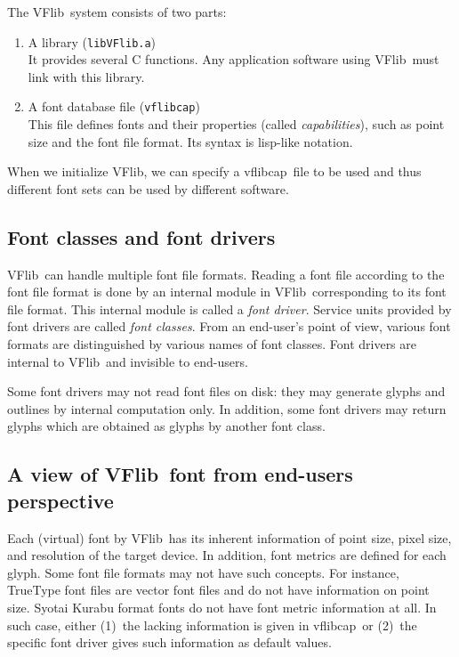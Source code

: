 \documentclass{cah-gut}
\newcommand{\pkg}[1]{\textsf{#1}}
\newcommand{\file}[1]{\texttt{#1}}
\newcommand{\VFlib}{\pkg{VFlib}}
\newcommand{\vflibcap}{\pkg{vflibcap}}
\begin{document}
The \VFlib\ system consists of two parts:

\begin{enumerate}
\item A library (\file{libVFlib.a}) \\
  It provides several C functions.  Any application software using
  \VFlib\ must link with this library.
\item A font database file (\file{vflibcap}) \\
  This file defines fonts and their properties (called {\em capabilities}),
  such as point size and the font file format.  Its syntax is lisp-like
  notation.
\end{enumerate}

When we initialize \VFlib, we can specify a \vflibcap\ file to be used
and thus different font sets can be used by different software.

\subsection{Font classes and font drivers}

\VFlib\ can handle multiple font file formats.  Reading a font file
according to the font file format is done by an internal module in
\VFlib\ corresponding to its font file format.  This internal module
is called a {\em font driver}.  Service units provided by font drivers
are called {\em font classes}.  From an end-user's point of view,
various font formats are distinguished by various names of font
classes.  Font drivers are internal to \VFlib\ and invisible to
end-users.

Some font drivers may not read font files on disk: they may generate
glyphs and outlines by internal computation only.  In addition, some
font drivers may return glyphs which are obtained as glyphs by another
font class.

\subsection{A view of \VFlib\ font from end-users perspective}

Each (virtual) font by \VFlib\ has its inherent information of point
size, pixel size, and resolution of the target device.  In addition,
font metrics are defined for each glyph.  
Some font file formats may not have such concepts.
For instance, TrueType font files are vector font
files and do not have information on point size.  
Syotai Kurabu format fonts do not have font metric information at all.  
In such case, either (1)~the lacking information 
is given in \vflibcap\ or (2)~the specific font driver gives such 
information as default values. 
\end{document}
